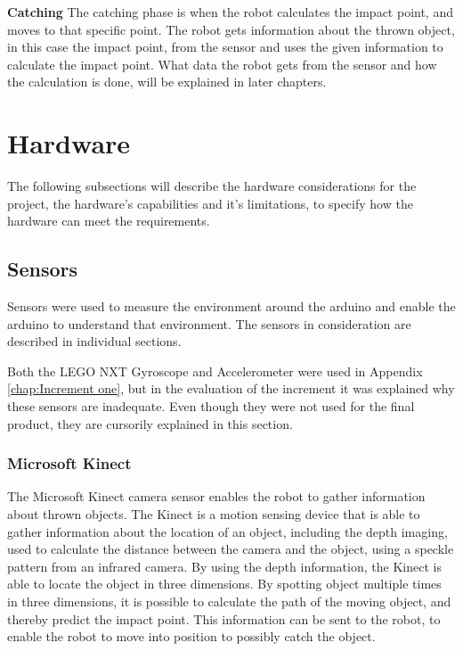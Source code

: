 \textbf{Catching}\newline
The catching phase is when the robot calculates the impact point, and moves to that specific point. The robot gets information about the thrown object, in this case the impact point, from the sensor and uses the given information to calculate the impact point. What data the robot gets from the sensor and how the calculation is done, will be explained in later chapters. 

\section{Hardware}
\label{sec:Hardware} 
The following subsections will describe the hardware considerations for the project, the hardware’s capabilities and it’s limitations, to specify how the hardware can meet the requirements.

\subsection{Sensors}
\label{sec:Sensors}
Sensors were used to measure the environment around the arduino and enable the arduino to understand that environment. The sensors in consideration are described in individual sections. 

Both the LEGO NXT Gyroscope and Accelerometer were used in Appendix \ref{chap:Increment one}, but in the evaluation of the increment it was explained why these sensors are inadequate. Even though they were not used for the final product, they are cursorily explained in this section.

\subsubsection{Microsoft Kinect}
\label{sec:Microsoft Kinect}
The Microsoft Kinect camera sensor enables the robot to gather information about thrown objects. The Kinect is a motion sensing device that is able to gather information about the location of an object, including the depth imaging, used to calculate the distance between the camera and the object, using a speckle pattern from an infrared camera. By using the depth information, the Kinect is able to locate the object in three dimensions.
By spotting object multiple times in three dimensions, it is possible to calculate the path of the moving object, and thereby predict the impact point. This information can be sent to the robot, to enable the robot to move into position to possibly catch the object.

